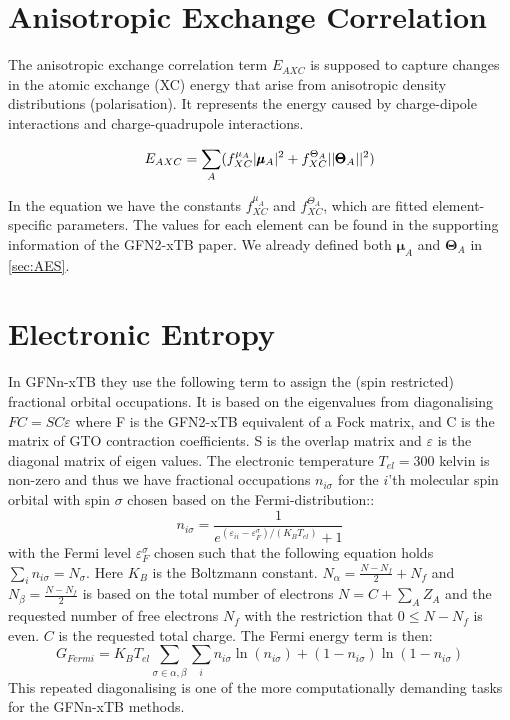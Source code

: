\section{Anisotropic Exchange Correlation}

The anisotropic exchange correlation term $E_{AXC}$ is supposed to capture changes in the atomic exchange (XC) energy that arise from anisotropic density distributions (polarisation). It represents the energy caused by charge-dipole interactions and charge-quadrupole interactions.

\begin{equation}
\begin{split}
        \E{AXC} &= \sum_{A} (f_{XC}^{\mu_A} |\pmb{\mu}_A|^2 + f_{XC}^{\Theta_A} ||\pmb{\Theta}_A||^2)\\
\end{split}
\end{equation}

In the equation we have the constants $f_{XC}^{\mu_A}$ and $f_{XC}^{\Theta_A}$, which are fitted element-specific parameters. The values for each element can be found in the supporting information of the GFN2-xTB paper\cite{bannwarth2019}.
We already defined both $\pmb{\mu}_A$ and $\pmb{\Theta}_A$ in \autoref{sec:AES}. 

\section{Electronic Entropy}
In GFNn-xTB they use the following term to assign the (spin restricted) fractional orbital occupations. It is based on the eigenvalues from diagonalising $FC=SC\varepsilon$ where F is the GFN2-xTB equivalent of a Fock matrix, and C is the matrix of GTO contraction coefficients. S is the overlap matrix and $\varepsilon$ is the diagonal matrix of eigen values. The electronic temperature $T_{el}=300$ kelvin is non-zero and thus we have fractional occupations $n_{i\sigma}$ for the $i$'th molecular spin orbital with spin $\sigma$ chosen based on the Fermi-distribution:: 
\begin{equation}
    n_{i\sigma} = \frac{1}{e^{(\varepsilon_{ii}-\varepsilon^\sigma_F)/(K_BT_{el})}+1}
\end{equation}
with the Fermi level $\varepsilon_F^\sigma$ chosen such that the following equation holds $\sum_in_{i\sigma}=N_{\sigma}$. Here $K_B$ is the Boltzmann constant. $N_\alpha=\frac{N-N_f}{2}+N_f $ and $N_\beta=\frac{N-N_f}{2}$ is based on the total number of electrons $N=C+\sum_AZ_A$ and the requested number of free electrons $N_f$ with the restriction that $0\leq N-N_f$ is even. $C$ is the requested total charge. 
The Fermi energy term is then:
\begin{equation}
    G_{Fermi} = K_BT_{el}\sum_{\sigma\in\alpha,\beta}\sum_in_{i\sigma}\ln(n_{i\sigma}) + (1-n_{i\sigma})\ln(1-n_{i\sigma})
\end{equation}
This repeated diagonalising is one of the more computationally demanding tasks for the GFNn-xTB methods. 



